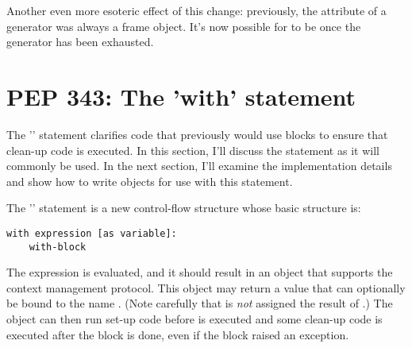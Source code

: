 \documentclass{howto}
\begin{document}
Another even more esoteric effect of this change: previously, the
 attribute of a generator was always a frame object.
It's now possible for  to be 
once the generator has been exhausted.

\begin{seealso}




\end{seealso}


\section{PEP 343: The 'with' statement\label{pep-343}}

The '' statement clarifies code that previously would
use  blocks to ensure that clean-up code is
executed.  In this section, I'll discuss the statement as it will
commonly be used.  In the next section, I'll examine the
implementation details and show how to write objects for use with this
statement.

The '' statement is a new control-flow structure whose
basic structure is:

\begin{verbatim}
with expression [as variable]:
    with-block
\end{verbatim}

The expression is evaluated, and it should result in an object that
supports the context management protocol.  This object may return a
value that can optionally be bound to the name .  (Note
carefully that  is \emph{not} assigned the result of
.)  The object can then run set-up code
before  is executed and some clean-up code
is executed after the block is done, even if the block raised an exception.
\end{document}
